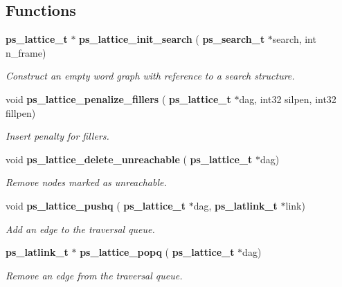 \subsection*{Functions}
\begin{DoxyCompactItemize}
\item 
\mbox{\label{ps__lattice__internal_8h_a606f6ee0fd569dd5829d7f84ae7e61bd}} 
\textbf{ ps\+\_\+lattice\+\_\+t} $\ast$ \textbf{ ps\+\_\+lattice\+\_\+init\+\_\+search} (\textbf{ ps\+\_\+search\+\_\+t} $\ast$search, int n\+\_\+frame)
\begin{DoxyCompactList}\small\item\em Construct an empty word graph with reference to a search structure. \end{DoxyCompactList}\item 
\mbox{\label{ps__lattice__internal_8h_a551b8246b45e8953491a24db438c59c1}} 
void \textbf{ ps\+\_\+lattice\+\_\+penalize\+\_\+fillers} (\textbf{ ps\+\_\+lattice\+\_\+t} $\ast$dag, int32 silpen, int32 fillpen)
\begin{DoxyCompactList}\small\item\em Insert penalty for fillers. \end{DoxyCompactList}\item 
\mbox{\label{ps__lattice__internal_8h_a6da4e36322aaab4d2ebe812bee9a4439}} 
void \textbf{ ps\+\_\+lattice\+\_\+delete\+\_\+unreachable} (\textbf{ ps\+\_\+lattice\+\_\+t} $\ast$dag)
\begin{DoxyCompactList}\small\item\em Remove nodes marked as unreachable. \end{DoxyCompactList}\item 
\mbox{\label{ps__lattice__internal_8h_a04896ebe0e2592bc7950d413b5d5c52e}} 
void \textbf{ ps\+\_\+lattice\+\_\+pushq} (\textbf{ ps\+\_\+lattice\+\_\+t} $\ast$dag, \textbf{ ps\+\_\+latlink\+\_\+t} $\ast$link)
\begin{DoxyCompactList}\small\item\em Add an edge to the traversal queue. \end{DoxyCompactList}\item 
\mbox{\label{ps__lattice__internal_8h_a481c4d941368597e11b0af4709bd03b0}} 
\textbf{ ps\+\_\+latlink\+\_\+t} $\ast$ \textbf{ ps\+\_\+lattice\+\_\+popq} (\textbf{ ps\+\_\+lattice\+\_\+t} $\ast$dag)
\begin{DoxyCompactList}\small\item\em Remove an edge from the traversal queue. \end{DoxyCompactList}\item 

\end{DoxyCompactItemize}
